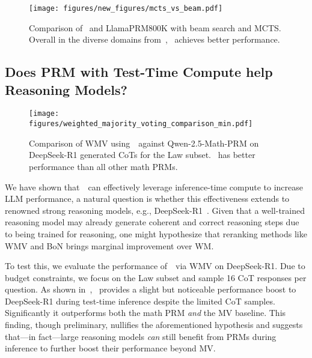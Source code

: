 \begin{figure}[t]
    \centering
    \texttt{[image: figures/new\_figures/mcts\_vs\_beam.pdf]}
    \caption{Comparison of \ourprm~and LlamaPRM800K with beam search and MCTS. Overall in the diverse domains from~\ourdataeval, \ourprm~achieves better performance.}
    \label{fig:prm-mcts}
    \vskip -0.2in
\end{figure}


\subsection{Does PRM with Test-Time Compute help Reasoning Models?}
\label{sec:deepseek}



\begin{figure}[t]
    \centering
    \texttt{[image: figures/weighted\_majority\_voting\_comparison\_min.pdf]}
    \caption{Comparison of WMV using~\ourprm~against Qwen-2.5-Math-PRM on DeepSeek-R1 generated CoTs for the Law subset. \ourprm~has better performance than all other math PRMs.}
    \label{fig:multiprm-deepseek}
\end{figure}


We have shown that~\ourprm~can effectively leverage inference-time compute to increase LLM performance,
a natural question is whether this effectiveness extends to renowned strong reasoning models,
e.g., DeepSeek-R1~\citep{guo2025deepseek}.
Given that a well-trained reasoning model may already generate coherent and correct reasoning steps due to being trained for reasoning,
one might hypothesize that reranking methods like WMV and BoN brings marginal improvement over WM.


To test this, we evaluate the performance of~\ourprm~via WMV on DeepSeek-R1.
Due to budget constraints, we focus on the Law subset and sample 16 CoT responses per question. As shown in~, \ourprm~provides a slight but noticeable performance boost to DeepSeek-R1 during test-time inference despite the limited CoT samples. Significantly it outperforms both the math PRM \emph{and} the MV baseline.
This finding, though preliminary, nullifies the aforementioned hypothesis and suggests that---in fact---large reasoning models \emph{can} still benefit from PRMs during inference to further boost their performance beyond MV.




